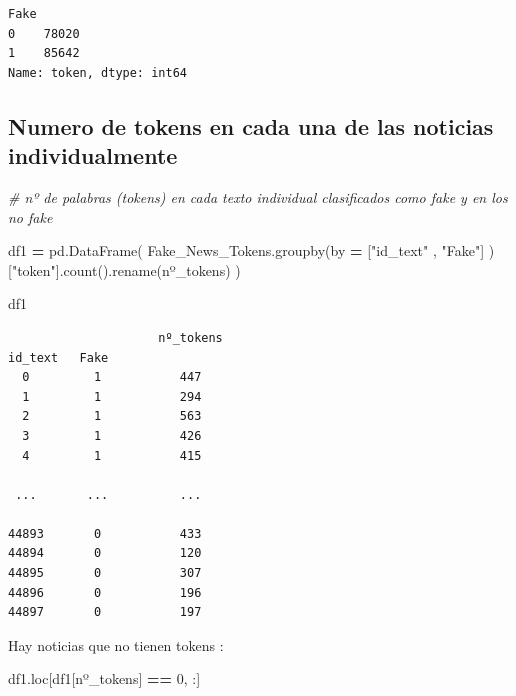 \documentclass[
  11pt,
  a4paper,
]{article}
\newenvironment{Shaded}{\begin{snugshade}}{\end{snugshade}}
\newcommand{\CommentTok}[1]{\textcolor[rgb]{0.56,0.35,0.01}{\textit{#1}}}
\newcommand{\DecValTok}[1]{\textcolor[rgb]{0.00,0.00,0.81}{#1}}
\newcommand{\NormalTok}[1]{#1}
\newcommand{\OperatorTok}[1]{\textcolor[rgb]{0.81,0.36,0.00}{\textbf{#1}}}
\newcommand{\StringTok}[1]{\textcolor[rgb]{0.31,0.60,0.02}{#1}}
\begin{document}
\begin{verbatim}
Fake
0    78020
1    85642
Name: token, dtype: int64
\end{verbatim}

\hypertarget{numero-de-tokens-en-cada-una-de-las-noticias-individualmente}{%
\subsection{Numero de tokens en cada una de las noticias
individualmente}\label{numero-de-tokens-en-cada-una-de-las-noticias-individualmente}}

\begin{Shaded}
\begin{Highlighting}[]
\CommentTok{\# nº de palabras (tokens) en cada texto individual clasificados como fake y en los no fake}

\NormalTok{df1 }\OperatorTok{=}\NormalTok{ pd.DataFrame( Fake\_News\_Tokens.groupby(by }\OperatorTok{=}\NormalTok{ [}\StringTok{"id\_text"}\NormalTok{ , }\StringTok{"Fake"}\NormalTok{] )[}\StringTok{"token"}\NormalTok{].count().rename(}\StringTok{\textquotesingle{}nº\_tokens\textquotesingle{}}\NormalTok{) )}
\end{Highlighting}
\end{Shaded}

\begin{Shaded}
\begin{Highlighting}[]
\NormalTok{df1}
\end{Highlighting}
\end{Shaded}

\begin{verbatim}
                     nº_tokens
id_text   Fake           
  0         1           447
  1         1           294
  2         1           563
  3         1           426
  4         1           415

 ...       ...          ...

44893       0           433
44894       0           120
44895       0           307
44896       0           196
44897       0           197
\end{verbatim}

Hay noticias que no tienen tokens :

\begin{Shaded}
\begin{Highlighting}[]
\NormalTok{df1.loc[df1[}\StringTok{\textquotesingle{}nº\_tokens\textquotesingle{}}\NormalTok{] }\OperatorTok{==} \DecValTok{0}\NormalTok{, :]}
\end{Highlighting}
\end{Shaded}
\end{document}
